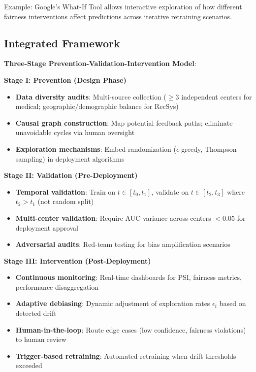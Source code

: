 \documentclass[11pt,a4paper]{article}
\begin{document}
Example: Google's What-If Tool allows interactive exploration of how different fairness interventions affect predictions across iterative retraining scenarios.

\subsection{Integrated Framework}

\textbf{Three-Stage Prevention-Validation-Intervention Model}:

\textbf{Stage I: Prevention (Design Phase)}  
\begin{itemize}
    \item \textbf{Data diversity audits}: Multi-source collection ($\geq$3 independent centers for medical; geographic/demographic balance for RecSys)
    \item \textbf{Causal graph construction}: Map potential feedback paths; eliminate unavoidable cycles via human oversight
    \item \textbf{Exploration mechanisms}: Embed randomization ($\epsilon$-greedy, Thompson sampling) in deployment algorithms
\end{itemize}

\textbf{Stage II: Validation (Pre-Deployment)}  
\begin{itemize}
    \item \textbf{Temporal validation}: Train on $t \in [t_0, t_1]$, validate on $t \in [t_2, t_3]$ where $t_2 > t_1$ (not random split)
    \item \textbf{Multi-center validation}: Require AUC variance across centers $< 0.05$ for deployment approval
    \item \textbf{Adversarial audits}: Red-team testing for bias amplification scenarios
\end{itemize}

\textbf{Stage III: Intervention (Post-Deployment)}  
\begin{itemize}
    \item \textbf{Continuous monitoring}: Real-time dashboards for PSI, fairness metrics, performance disaggregation
    \item \textbf{Adaptive debiasing}: Dynamic adjustment of exploration rates $\epsilon_t$ based on detected drift
    \item \textbf{Human-in-the-loop}: Route edge cases (low confidence, fairness violations) to human review
    \item \textbf{Trigger-based retraining}: Automated retraining when drift thresholds exceeded
\end{itemize}
\end{document}
